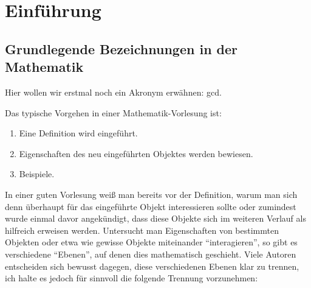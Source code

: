 \chapter{Einführung}

\section{Grundlegende Bezeichnungen in der Mathematik} \label{sec:grundlegende-bezeichnungen-in-der-mathematik}

Hier wollen wir erstmal noch ein Akronym erwähnen: \acrfull{gcd}.

Das typische Vorgehen in einer Mathematik-Vorlesung ist:
\begin{enumerate}
    \item Eine Definition wird eingeführt. 
    \item Eigenschaften des neu eingeführten Objektes werden bewiesen. 
    \item Beispiele. 
\end{enumerate}
In einer guten Vorlesung weiß man bereits vor der Definition, warum man sich denn überhaupt für das eingeführte Objekt interessieren sollte oder zumindest wurde einmal davor angekündigt, dass diese Objekte sich im weiteren Verlauf als hilfreich erweisen werden. Untersucht man Eigenschaften von bestimmten Objekten oder etwa wie gewisse Objekte miteinander "`interagieren"', so gibt es verschiedene "`Ebenen"', auf denen dies mathematisch geschieht. Viele Autoren entscheiden sich bewusst dagegen, diese verschiedenen Ebenen klar zu trennen, ich halte es jedoch für sinnvoll die folgende Trennung vorzunehmen: 
